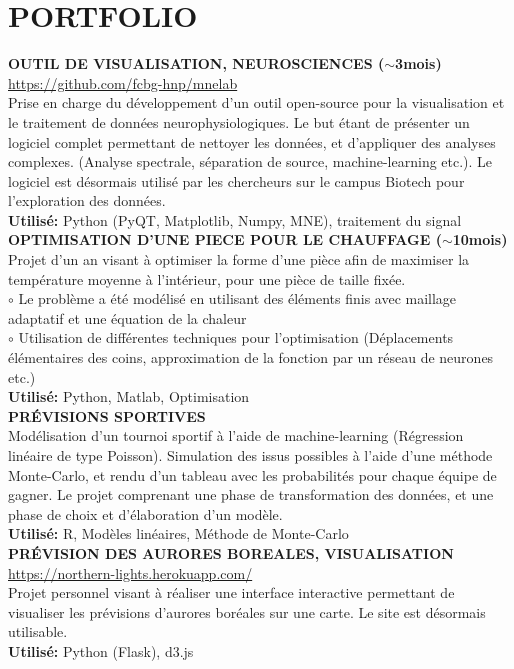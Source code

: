 \documentclass[]{cv-style}
\begin{document}
\section{PORTFOLIO}
\textbf{OUTIL DE VISUALISATION, NEUROSCIENCES ($\sim$3mois)}\\
\url{https://github.com/fcbg-hnp/mnelab}\\
    Prise en charge du développement d'un outil open-source pour la 
    visualisation et le traitement de données neurophysiologiques. Le but étant
    de présenter un logiciel complet permettant de nettoyer les données, et 
    d'appliquer des analyses complexes. (Analyse spectrale, séparation de 
    source, machine-learning etc.). Le logiciel est désormais utilisé par les 
    chercheurs sur le campus Biotech pour l'exploration des données.\\
\textbf{Utilisé:} Python (PyQT, Matplotlib, Numpy, MNE), traitement du signal 
\\[0.4cm]
\textbf{OPTIMISATION D'UNE PIECE POUR LE CHAUFFAGE ($\sim$10mois)}\\
    Projet d'un an visant à optimiser la forme d'une pièce afin de maximiser 
    la température moyenne à l'intérieur, pour une pièce de taille fixée.\\
    $\circ$ Le problème a été modélisé en utilisant des éléments finis avec 
    maillage adaptatif et une équation de la chaleur\\
    $\circ$ Utilisation de différentes techniques pour l'optimisation 
    (Déplacements élémentaires des coins, approximation de la fonction par un 
    réseau de neurones etc.) \\
\textbf{Utilisé:} Python, Matlab, Optimisation \\[0.4cm]
\textbf{PRÉVISIONS SPORTIVES}\\
Modélisation d'un tournoi sportif à l'aide de machine-learning (Régression 
linéaire de type Poisson). Simulation des issus possibles à l'aide d'une 
méthode Monte-Carlo, et rendu d'un tableau avec les probabilités pour chaque 
équipe de gagner. Le projet comprenant une phase de transformation des données,
et une phase de choix et d'élaboration d'un modèle.\\
\textbf{Utilisé:} R, Modèles linéaires, Méthode de Monte-Carlo \\[0.4cm]
\textbf{PRÉVISION DES AURORES BOREALES, VISUALISATION}\\
\url{https://northern-lights.herokuapp.com/}\\
    Projet personnel visant à réaliser une interface interactive permettant de
    visualiser les prévisions d'aurores boréales sur une carte. Le site est 
    désormais utilisable.\\
\textbf{Utilisé:} Python (Flask), d3.js \\[0.4cm]
\end{document}
